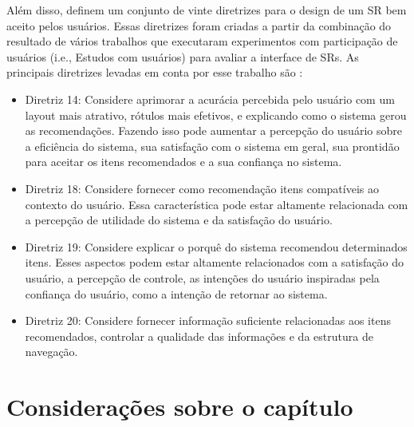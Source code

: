 Além disso,  definem um conjunto de vinte diretrizes para o design de um SR bem aceito
pelos usuários. Essas diretrizes foram criadas a partir da combinação do resultado de vários trabalhos que executaram
experimentos com participação de usuários (i.e., Estudos com usuários) para avaliar a interface de SRs. As principais
diretrizes levadas em conta por esse trabalho são \cite{pu2012evaluating}:

\begin{itemize}
\item Diretriz 14: Considere aprimorar a acurácia percebida pelo usuário com um layout mais atrativo, rótulos mais
efetivos, e explicando como o sistema gerou as recomendações. Fazendo isso pode aumentar a percepção do usuário sobre a
eficiência do sistema, sua satisfação com o sistema em geral, sua prontidão para aceitar os itens recomendados e a sua
confiança no sistema.
\item Diretriz 18: Considere fornecer como recomendação itens compatíveis ao contexto do usuário. Essa característica
pode estar altamente relacionada com a percepção de utilidade do sistema e da satisfação do usuário.
\item Diretriz 19: Considere explicar o porquê do sistema recomendou determinados itens. Esses aspectos podem estar
altamente relacionados com a satisfação do usuário, a percepção de controle, as intenções do usuário inspiradas pela
confiança do usuário, como a intenção de retornar ao sistema.
\item Diretriz 20: Considere fornecer informação suficiente relacionadas aos itens recomendados, controlar a qualidade
das informações e da estrutura de navegação.
\end{itemize}

\section{Considerações sobre o capítulo}
